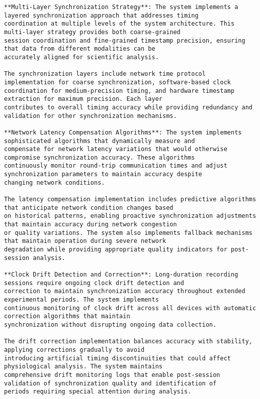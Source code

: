 \documentclass[11pt,a4paper]{report}
\begin{document}
\begin{verbatim}
**Multi-Layer Synchronization Strategy**: The system implements a layered synchronization approach that addresses timing
coordination at multiple levels of the system architecture. This multi-layer strategy provides both coarse-grained
session coordination and fine-grained timestamp precision, ensuring that data from different modalities can be
accurately aligned for scientific analysis.

The synchronization layers include network time protocol implementation for coarse synchronization, software-based clock
coordination for medium-precision timing, and hardware timestamp extraction for maximum precision. Each layer
contributes to overall timing accuracy while providing redundancy and validation for other synchronization mechanisms.

**Network Latency Compensation Algorithms**: The system implements sophisticated algorithms that dynamically measure and
compensate for network latency variations that would otherwise compromise synchronization accuracy. These algorithms
continuously monitor round-trip communication times and adjust synchronization parameters to maintain accuracy despite
changing network conditions.

The latency compensation implementation includes predictive algorithms that anticipate network condition changes based
on historical patterns, enabling proactive synchronization adjustments that maintain accuracy during network congestion
or quality variations. The system also implements fallback mechanisms that maintain operation during severe network
degradation while providing appropriate quality indicators for post-session analysis.

**Clock Drift Detection and Correction**: Long-duration recording sessions require ongoing clock drift detection and
correction to maintain synchronization accuracy throughout extended experimental periods. The system implements
continuous monitoring of clock drift across all devices with automatic correction algorithms that maintain
synchronization without disrupting ongoing data collection.

The drift correction implementation balances accuracy with stability, applying corrections gradually to avoid
introducing artificial timing discontinuities that could affect physiological analysis. The system maintains
comprehensive drift monitoring logs that enable post-session validation of synchronization quality and identification of
periods requiring special attention during analysis.


\end{verbatim}
\end{document}
